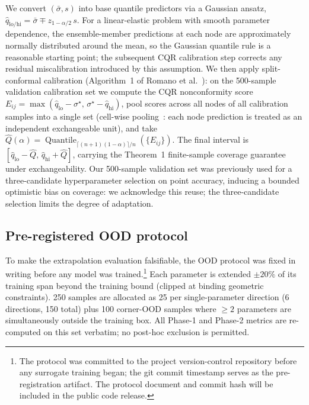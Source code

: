 \documentclass{article}
\begin{document}
We convert $(\bar{\sigma}, s)$ into base quantile predictors via a
Gaussian ansatz, $\hat{q}_{\text{lo/hi}} = \bar{\sigma} \mp
z_{1-\alpha/2}\,s$. For a linear-elastic problem with smooth parameter
dependence, the ensemble-member predictions at each node are
approximately normally distributed around the mean, so the Gaussian
quantile rule is a reasonable starting point; the subsequent CQR
calibration step corrects any residual miscalibration introduced by
this assumption. We then apply split-conformal calibration (Algorithm~1
of Romano et al.~\citep{romano2019cqr}): on the 500-sample validation
calibration set we compute the CQR nonconformity score $E_{ij} =
\max(\hat{q}_{\text{lo}} - \sigma^\star,\, \sigma^\star -
\hat{q}_{\text{hi}})$, pool scores across all nodes of all calibration
samples into a single set (cell-wise
pooling~\citep{gopakumar2024conformal}: each node prediction is
treated as an independent exchangeable unit), and take
$\hat{Q}(\alpha) = \operatorname{Quantile}_{\lceil (n+1)(1-\alpha)
\rceil/n}(\{E_{ij}\})$. The final interval is $[\hat{q}_{\text{lo}} -
\hat{Q},\, \hat{q}_{\text{hi}} + \hat{Q}]$, carrying the Theorem~1
finite-sample coverage guarantee under exchangeability. Our 500-sample
validation set was previously used for a three-candidate hyperparameter
selection on point accuracy, inducing a bounded optimistic bias on
coverage: we acknowledge this reuse; the three-candidate selection
limits the degree of adaptation.

\subsection{Pre-registered OOD protocol}
\label{ssec:ood-protocol}

To make the extrapolation evaluation falsifiable, the OOD protocol was
fixed in writing before any model was trained.\footnote{The protocol
was committed to the project version-control repository before any
surrogate training began; the git commit timestamp serves as the
pre-registration artifact. The protocol document and commit hash will
be included in the public code release.} Each parameter is extended
$\pm 20\%$ of its training span beyond the training bound (clipped at
binding geometric constraints). 250 samples are allocated as 25 per
single-parameter direction (6 directions, 150 total) plus 100
corner-OOD samples where $\geq 2$ parameters are simultaneously outside
the training box. All Phase-1 and Phase-2 metrics are re-computed on this
set verbatim; no post-hoc exclusion is permitted.
\end{document}
